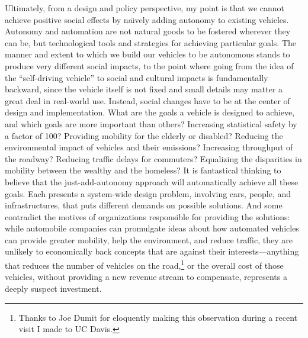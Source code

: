 Ultimately, from a design and policy perspective, my point is that we
cannot achieve positive social effects by na\"{\i}vely adding autonomy to
existing vehicles. Autonomy and automation are not natural goods to be
fostered wherever they can be, but technological tools and strategies
for achieving particular goals. The manner and extent to which we
build our vehicles to be autonomous stands to produce very different
social impacts, to the point where going from the idea of the
``self-driving vehicle'' to social and cultural impacts is
fundamentally backward, since the vehicle itself is not fixed and
small details may matter a great deal in real-world use. Instead,
social changes have to be at the center of design and implementation.
What are the goals a vehicle is designed to achieve, and which goals
are more important than others? Increasing
statistical safety by a factor of 100? Providing mobility for the
elderly or disabled? Reducing the environmental impact of vehicles and
their emissions? Increasing throughput of the roadway? Reducing
traffic delays for commuters? Equalizing the 
disparities in mobility between the wealthy and the homeless? It is
fantastical thinking to believe that the just-add-autonomy approach
will automatically achieve all these goals. Each presents a
system-wide design problem, involving cars, people, and
infrastructures, that puts different demands on possible solutions.
And some contradict the motives of organizations responsible for
providing the solutions:  while automobile companies can promulgate
ideas about how automated vehicles can provide greater mobility, help
the environment, and reduce traffic, they are unlikely to economically
back concepts that are against their interests---anything that reduces
the number of vehicles on the road,\footnote{Thanks to Joe Dumit for eloquently
  making this observation during a recent visit I made to UC Davis.}
or the overall cost of those 
vehicles, without providing a new revenue stream to compensate,
represents a deeply suspect investment. 


